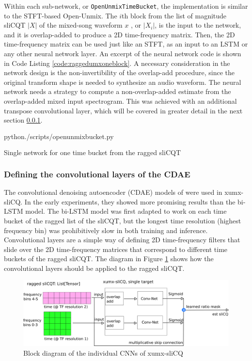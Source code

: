 \documentclass[report.tex]{subfiles}
\begin{document}
Within each sub-network, or \Verb#OpenUnmixTimeBucket#, the implementation is similar to the STFT-based Open-Unmix. The $i$th block from the list of magnitude sliCQT $|X|$ of the mixed-song waveform $x$ , or $|X_{i}|$, is the input to the network, and it is overlap-added to produce a 2D time-frequency matrix. Then, the 2D time-frequency matrix can be used just like an STFT, as an input to an LSTM or any other neural network layer. An excerpt of the neural network code is shown in Code Listing \ref{code:raggedumxoneblock}.  A necessary consideration in the network design is the non-invertibility of the overlap-add procedure, since the original transform shape is needed to synthesize an audio waveform. The neural network needs a strategy to compute a non-overlap-added estimate from the overlap-added mixed input spectrogram. This was achieved with an additional transpose convolutional layer, which will be covered in greater detail in the next section \ref{sec:convlayers}.

\begin{listing}[ht]
  \centering
\begin{inputminted}[linenos,breaklines,frame=single,fontsize=\scriptsize]{python}{./scripts/openunmixbucket.py}
\end{inputminted}
  \caption{Single network for one time bucket from the ragged sliCQT}
  \label{code:raggedumxoneblock}
\end{listing}

\subsubsection{Defining the convolutional layers of the CDAE}
\label{sec:convlayers}

The convolutional denoising autoencoder (CDAE) models of \textcite{plumbley1, plumbley2} were used in xumx-sliCQ. In the early experiments, they showed more promising results than the bi-LSTM model. The bi-LSTM model was first adapted to work on each time bucket of the ragged list of the sliCQT, but the longest time resolution (highest frequency bin) was prohibitively slow in both training and inference. Convolutional layers are a simple way of defining 2D time-frequency filters that slide over the 2D time-frequency matrices that correspond to different time buckets of the ragged sliCQT. The diagram in Figure \ref{fig:cdaeslicqt} shows how the convolutional layers should be applied to the ragged sliCQT.

\begin{figure}[ht]
	\centering
	\includegraphics[width=\textwidth]{./images-blockdiagrams/xumx_slicq_pertarget_largefont.png}
	\caption{Block diagram of the individual CNNs of xumx-sliCQ}
	\label{fig:cdaeslicqt}
\end{figure}
\end{document}
